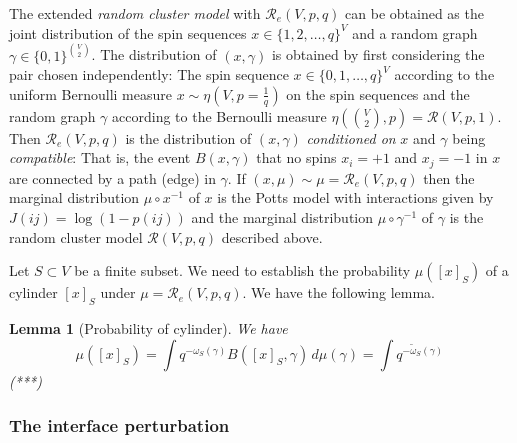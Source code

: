 \documentclass[11pt, a4paper]{amsart}
\newtheorem{lem}[thm]{Lemma}
\theoremstyle{definition}
\theoremstyle{remark}
\renewcommand{\d}{\,d}
\providecommand{\mscr}{\mathscr}
\providecommand{\g}{\gamma}
\providecommand{\w}{\omega}
\begin{document}
The extended \emph{random cluster model} with $\mscr R_e(V,p,q)$ can be obtained
as the joint distribution of the spin sequences $x\in\{1,2,\dots,q\}^{V}$ and a
random graph $\gamma\in\{0,1\}^{\binom V2}$. The distribution of $(x,\gamma)$ is obtained by first considering the pair chosen independently: The spin sequence
$x\in\{0,1,\dots,q\}^{V}$ according to the uniform Bernoulli measure
$x\sim\eta(V,p=\frac1q)$ on the spin sequences and the random graph $\gamma$ according to
the Bernoulli measure $\eta(\binom V2, p)=\mscr R(V,p,1)$. Then $\mscr R_e(V,p,q)$
is the distribution of $(x,\gamma)$ \emph{conditioned on} $x$ and $\gamma$ being
\emph{compatible}: That is, the event $B(x,\g)$ that no spins $x_i=+1$ and
$x_j=-1$ in $x$ are connected by a path (edge) in $\g$.
If $(x,\mu)\sim\mu=\mscr R_e(V,p,q)$ 
then the marginal distribution $\mu\circ x^{-1}$ of $x$
is the Potts model with interactions given by $J(ij)=\log(1-p(ij))$ and the
marginal distribution $\mu\circ\gamma^{-1}$ of $\gamma$ is the random cluster model
$\mscr R(V,p,q)$ described above.

Let $S\subset V$ be a finite subset.
We need to establish the probability $\mu([x]_S)$ of a cylinder $[x]_S$ under
$\mu=\mscr R_e(V,p,q)$. We have the following lemma.

\begin{lem}[Probability of cylinder]
  We have
  \[
    \mu([x]_S) =  \int q^{-\w_S(\g)} B([x]_S,\g) \d\mu(\g)
    = \int q^{-\tilde\w_S(\g)} \,
  \]
  (***)
\end{lem}


\subsubsection{The interface perturbation}
\end{document}
